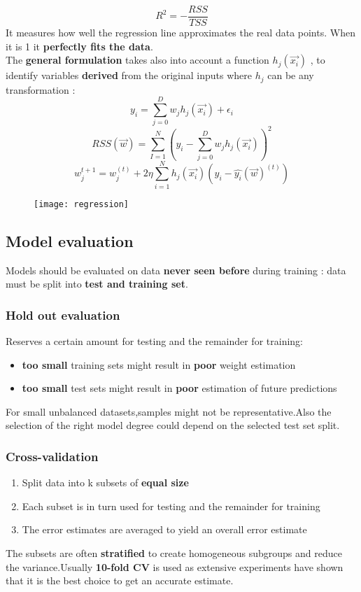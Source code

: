 $$ R^2 = - \frac{RSS}{TSS}$$
It measures how well the regression line approximates the real data points. When it is 1 it \textbf{perfectly fits the data}.\\
The \textbf{general formulation} takes also into account a function $h_j(\overrightarrow{x_i})$ , to identify variables \textbf{derived} from the original inputs where $h_j$ can be any transformation :
$$ y_i = \sum \limits_{j=0}^{D}w_jh_j(\overrightarrow{x_i})+\epsilon_i$$
$$ RSS(\overrightarrow{w}) = \sum \limits_{I=1}^{N}(y_i - \sum \limits_{j=0}^{D}w_jh_j(\overrightarrow{x_i}))^2$$
$$ w_j^{t+1} = w_j^{(t)}+2\eta \sum \limits_{i=1}^{N} h_j(\overrightarrow{x_i})(y_i-\hat{y_i}(\overrightarrow{w})^{(t)})$$
\begin{figure}[H]
  \centering
  \texttt{[image: regression]}
  \end{figure}

\subsection{Model evaluation}
Models should be evaluated on data \textbf{never seen before} during training : data must be split into \textbf{test and training set}.

\subsubsection{Hold out evaluation}
Reserves a certain amount for testing and the remainder for training:
\begin{itemize}
\item \textbf{too small} training sets might result in \textbf{poor} weight estimation
\item \textbf{too small} test sets might result in \textbf{poor} estimation of future predictions
\end{itemize}
For small unbalanced datasets,samples might not be representative.Also the selection of the right model degree could depend on the selected test set split.

\subsubsection{Cross-validation}
\begin{enumerate}
\item Split data into k subsets of \textbf{equal size}
\item Each subset is in turn used for testing and the remainder for training
\item The error estimates are averaged to yield an overall error estimate
\end{enumerate}
The subsets are often \textbf{stratified} to create homogeneous subgroups and reduce the variance.Usually \textbf{10-fold CV} is used as extensive experiments have shown that it is the best choice to get an accurate estimate.

